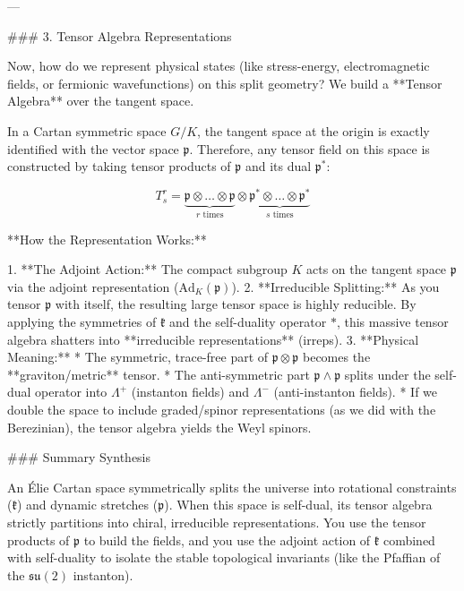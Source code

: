 ---

### 3. Tensor Algebra Representations

Now, how do we represent physical states (like stress-energy, electromagnetic fields, or fermionic wavefunctions) on this split geometry? We build a **Tensor Algebra** over the tangent space.

In a Cartan symmetric space $G/K$, the tangent space at the origin is exactly identified with the vector space $\mathfrak{p}$.
Therefore, any tensor field on this space is constructed by taking tensor products of $\mathfrak{p}$ and its dual $\mathfrak{p}^*$:


$$T_s^r = \underbrace{\mathfrak{p} \otimes \dots \otimes \mathfrak{p}}_{r \text{ times}} \otimes \underbrace{\mathfrak{p}^* \otimes \dots \otimes \mathfrak{p}^*}_{s \text{ times}}$$

**How the Representation Works:**

1. **The Adjoint Action:** The compact subgroup $K$ acts on the tangent space $\mathfrak{p}$ via the adjoint representation ($\text{Ad}_K(\mathfrak{p})$).
2. **Irreducible Splitting:** As you tensor $\mathfrak{p}$ with itself, the resulting large tensor space is highly reducible. By applying the symmetries of $\mathfrak{k}$ and the self-duality operator $*$, this massive tensor algebra shatters into **irreducible representations** (irreps).
3. **Physical Meaning:** * The symmetric, trace-free part of $\mathfrak{p} \otimes \mathfrak{p}$ becomes the **graviton/metric** tensor.
* The anti-symmetric part $\mathfrak{p} \wedge \mathfrak{p}$ splits under the self-dual operator into $\Lambda^+$ (instanton fields) and $\Lambda^-$ (anti-instanton fields).
* If we double the space to include graded/spinor representations (as we did with the Berezinian), the tensor algebra yields the Weyl spinors.



### Summary Synthesis

An Élie Cartan space symmetrically splits the universe into rotational constraints ($\mathfrak{k}$) and dynamic stretches ($\mathfrak{p}$). When this space is self-dual, its tensor algebra strictly partitions into chiral, irreducible representations. You use the tensor products of $\mathfrak{p}$ to build the fields, and you use the adjoint action of $\mathfrak{k}$ combined with self-duality to isolate the stable topological invariants (like the Pfaffian of the $\mathfrak{su}(2)$ instanton).

